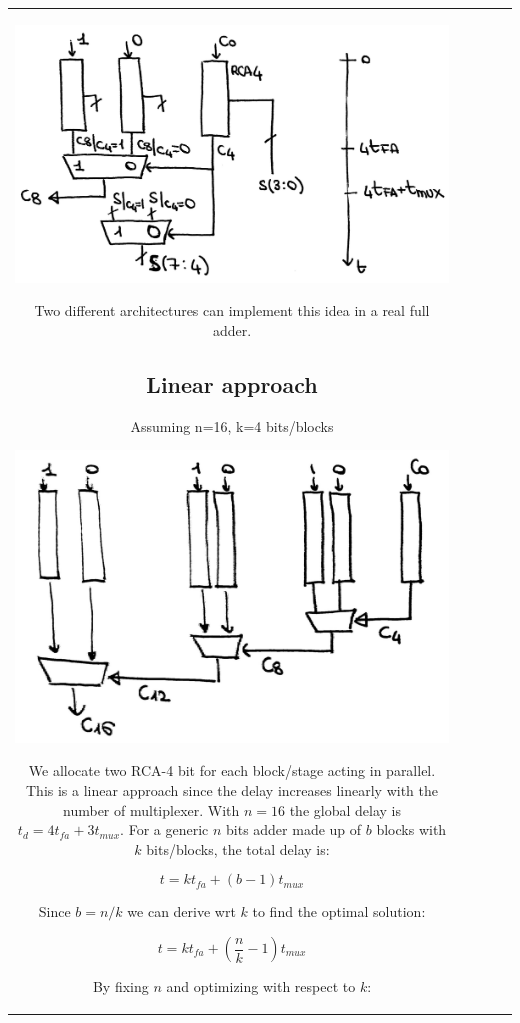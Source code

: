 \begin{center}
\begin{tabular}{|c|c|c|c|c|}
\begin{center}
  \includegraphics[width=0.7\linewidth]{img/img2/7}
\end{center}


 Two different architectures can implement this idea in a real full adder.

 \subsection{Linear approach}

Assuming n=16, k=4 bits/blocks

\begin{center}
  \includegraphics[width=0.7\linewidth]{img/img2/8}
\end{center}

 We allocate two RCA-4 bit for each block/stage acting in parallel. This is a linear approach since the delay increases linearly with the number of multiplexer.
 With $n=16$ the global delay is $t_d=4t_{fa}+3t_{mux}$. For a generic $n$ bits adder made up of $b$ blocks with $k$ bits/blocks, the total delay is:

 $$t=kt_{fa}+(b-1)t_{mux}$$

Since $b=n/k$ we can derive wrt $k$ to find the optimal solution:

$$t=kt_{fa}+(\frac{n}{k}-1)t_{mux}$$

By fixing $n$ and optimizing with respect to $k$:


\end{tabular}
\end{center}
